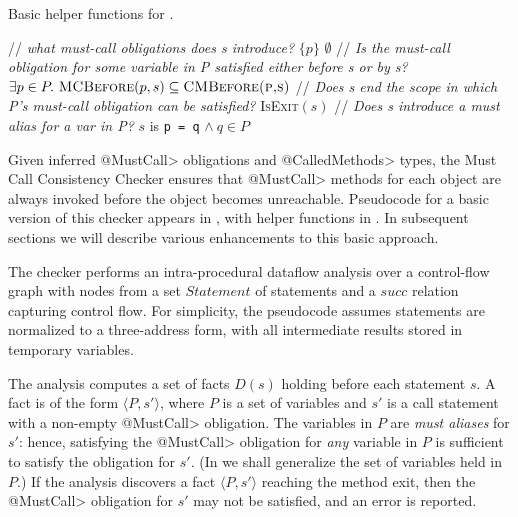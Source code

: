 \begin{algorithm}
  \caption{Basic helper functions for .}
  \label{alg:helpers}
  \begin{algorithmic}[1]
  \State // \textit{what must-call obligations does s introduce?}
    \State \Return $\{ p \}$
  \Else
    \State \Return $\emptyset$
  \EndIf
  \EndProcedure
  \State // \textit{Is the must-call obligation for some variable in P satisfied either before s or by s?}
  \State \Return $\exists p \in P .\ \textsc{MCBefore}(p,s) \subseteq \textsc{CMBefore(p,s)}$
  \EndProcedure
  \State // \textit{Does s end the scope in which P's must-call obligation can
  be satisfied?}
  \State \Return \textsc{IsExit}$(s)$
  \EndProcedure
  \State // \textit{Does s introduce a must alias for a var in P?}
    \State \Return $s$ is \lstinline{p = q} $\wedge\ q \in P$
  \EndProcedure
  \end{algorithmic}

\end{algorithm}


Given inferred \<@MustCall> obligations and \<@CalledMethods> types, the Must
Call Consistency Checker ensures that \<@MustCall> methods for each object
are always invoked before the object becomes unreachable.  Pseudocode for a
basic version of this checker appears in , with
helper functions in .  In subsequent sections we will describe
various enhancements to this basic approach.

The checker performs an intra-procedural dataflow analysis over a control-flow
graph with nodes from a set $\mathit{Statement}$ of statements and a
$\mathit{succ}$ relation capturing control flow.  For simplicity, the pseudocode
assumes statements are normalized to a three-address form, with all intermediate
results stored in temporary variables.  

The analysis computes a set of facts $D(s)$ holding before each statement $s$. A
fact is of the form $\langle P, s' \rangle$, where $P$ is a set of variables and
$s'$ is a call statement with a non-empty \<@MustCall> obligation. The variables
in $P$ are \emph{must aliases} for $s'$:  hence, satisfying the \<@MustCall>
obligation for \emph{any} variable in $P$ is sufficient to satisfy the
obligation for $s'$.  (In  we shall generalize the
set of variables held in $P$.)  If the analysis discovers a fact $\langle P, s'
\rangle$ reaching the method exit, then the \<@MustCall> obligation for $s'$ may
not be satisfied, and an error is reported.

